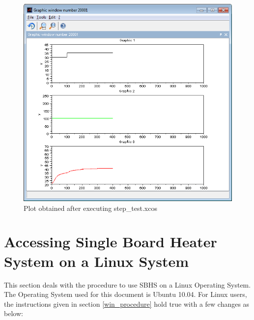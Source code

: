 \begin{figure}
\centering
\includegraphics[width=0.7\linewidth]{using-sbhs/plot.png}
\caption{Plot obtained after executing step\_test.xcos}
\label{plots}
\end{figure}

\section{Accessing Single Board Heater System on a Linux System}
This section deals with the procedure to use SBHS on a Linux Operating System. The Operating System used for this document is Ubuntu 10.04.
For Linux users, the instructions given in section \ref{win_procedure} hold true with a few changes as below:

